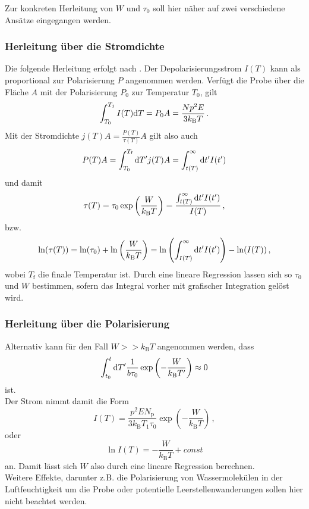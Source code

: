 Zur konkreten Herleitung von $W$ und $\tau_0$ soll hier näher auf zwei verschiedene Ansätze eingegangen werden.

\subsubsection{Herleitung über die Stromdichte}

Die folgende Herleitung erfolgt nach \cite[S. ~4]{fuller}. Der Depolarisierungsstrom $I(T)$ kann als proportional zur Polarisierung $P$ angenommen werden.
Verfügt die Probe über die Fläche $A$ mit der Polarisierung $P_0$ zur Temperatur $T_0$, gilt
\begin{equation*}
    \int^{T_1}_{T_0} I(T) \mathrm{d} T = P_0 A = \frac{N p^2 E}{3 k_\text{B}T} \,.
\end{equation*}
Mit der Stromdichte $j(T) A = \frac{P(T)}{\tau(T)} A$ gilt also auch
\begin{equation*}
    P(T) A = \int^{T_\text{f}}_{T_0} \mathrm{d} T' j(T) A  = \int^\infty_{t(T)} \mathrm{d} t' I(t')
\end{equation*}
und damit
\begin{equation}
    \tau(T) = \tau_0 \exp \left(\frac{W}{k_\text{B} T} \right) =  \frac{\int^\infty_{t(T)} \mathrm{d} t' I(t')}{I(T)} \,,
    \label{eq:relaxozeitpol}
\end{equation}
bzw.
\begin{equation}
    \ln(\tau(T)) = \ln(\tau_0) + \ln\left(\frac{W}{k_\text{B} T} \right) =  \ln \left(\int^\infty_{I(T)} \mathrm{d} t' I(t') \right) - \ln (I(T)) \,,
    \label{eq:lnrelaxozeitpol}
\end{equation}
wobei $T_\text{f}$ die finale Temperatur ist.
Durch eine lineare Regression lassen sich so $\tau_0$ und $W$ bestimmen, sofern das Integral vorher mit grafischer Integration gelöst wird.

\subsubsection{Herleitung über die Polarisierung}

Alternativ kann für den Fall $W >> k_\text{B} T$ angenommen werden, dass
\begin{equation*}
    \int^t_{t_0} \mathrm{d} T' \frac{1}{b \tau_0}  \exp \left(-\frac{W}{k_\text{B} T'} \right) \approx 0
\end{equation*}
ist. \\
Der Strom nimmt damit die Form
\begin{equation*}
    I(T) = \frac{p^2 E N_\text{p}}{3 k_\text{B} T_1 \tau_0} \exp(-\frac{W}{k_\text{B} T}) \, ,
\end{equation*}
oder
\begin{equation}
    \ln I(T) = - \frac{W}{k_\text{B} T} + const
    \label{eq:lnStrom}
\end{equation}
an.
Damit lässt sich $W$ also durch eine lineare Regression berechnen. \\

Weitere Effekte, darunter z.B. die Polarisierung von Wassermolekülen in der Luftfeuchtigkeit um die Probe oder potentielle Leerstellenwanderungen sollen hier nicht beachtet werden.




